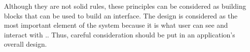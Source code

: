         Although they are not solid rules, these principles can be considered as building blocks that can be used to build an interface. The design is considered as the most important element of the system because it is what user can see and interact with \citep{galitz2007essential}.. Thus, careful consideration should be put in an application's overall design.
        \begin{comment}
        
        
        \begin{itemize}
        	\item Axis
            \item Symmetry
            \item Hierarchy
            \item Rhythm
\end{itemize}
        
        The axis, is an imaginary line that arranges, and aligns elements \citep{mandelbaum2014design}. It is considered as the most basic of the principles, but is equally important. When objects in an interface fall in or follow one axis, the design would give the impression of order. Additionally, the axis allows movement since it is a straight line that the user's eyes can follow \citep{mandelbaum2014design}. This movement can be used to direct users towards something in the design.
        
        The second principle, symmetry, works together with the axis to promote balance \citep{mandelbaum2014design}. Symmetry means balancing both sides of the axis, meaning both sides of an interface should be similar, and aligned. Having symmetry gives users the feeling of harmony, and even the slightest difference in alignment or order can throw of the balance of a design and give a feeling of discomfort \citep{mandelbaum2014design}.
        
        Hierarchy is about showing the importance of certain elements in a design \citep{mandelbaum2014design}. One example of this is making one article in a news feed larger than the rest. The larger article would catch the users attention first and give the impression that it is more urgent or important compared to others. Other ways to show hierarchy could be through its placing or its shape.
        
        Lastly, rhythm, denotes patterns in the design. Having rhythm in the design allows users to find patterns and better recognize and know where to look for particular information \citep{mandelbaum2014design}. This can be seen in a Twitter feed where a list of tweets would look the same, helping users where to find the like button, or the user's twitter handle, etc. 
        
        Although they are not solid rules, these principles can be considered as building blocks that can be used to build an interface. Again, careful consideration should be put in the design because it is considered as the most important element of the system because it is what the users can see and interact with \citep{galitz2007essential}.
        
        \end{comment}
        
